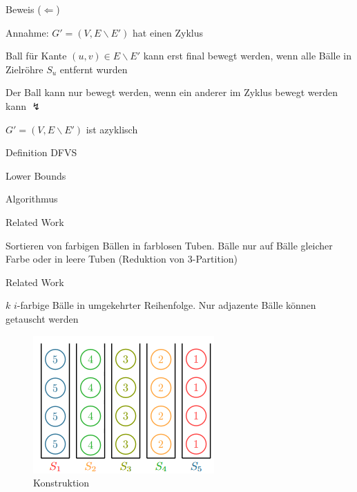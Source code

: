 \documentclass{beamer}
\begin{document}
\begin{frame}{Beweis (\glqq $\Leftarrow$\grqq)}
\begin{pointlist}
\item Annahme: $G'=(V,E\backslash E')$ hat einen Zyklus
\item Ball für Kante $(u,v)\in E\backslash E'$ kann erst final bewegt werden, wenn alle Bälle in Zielröhre $S_u$ entfernt wurden
\item Der Ball kann nur bewegt werden, wenn ein anderer im Zyklus bewegt werden kann $\lightning$ 
\begin{arrowlist}
\item $G'=(V,E\backslash E')$ ist azyklisch 
\end{arrowlist}
\end{pointlist}
\end{frame}

\begin{frame}{Definition DFVS}
\end{frame}

\begin{frame}{Lower Bounds}
\end{frame}

\begin{frame}{Algorithmus}
\end{frame}

\begin{frame}{Related Work}
	\begin{pointlist}
		\item Sortieren von farbigen Bällen in farblosen Tuben. Bälle nur auf Bälle gleicher Farbe oder in leere Tuben (Reduktion von 3-Partition)
	\end{pointlist}
\end{frame}

\begin{frame}{Related Work}
	\begin{pointlist}
		\item $k$ $i$-farbige Bälle in umgekehrter Reihenfolge. Nur adjazente Bälle können getauscht werden 
	\end{pointlist}
	\begin{figure}[ht]
		\includegraphics[width=.65\textwidth]{relatedwork}
		\caption{Konstruktion}
    \end{figure}
\end{frame}
\end{document}
